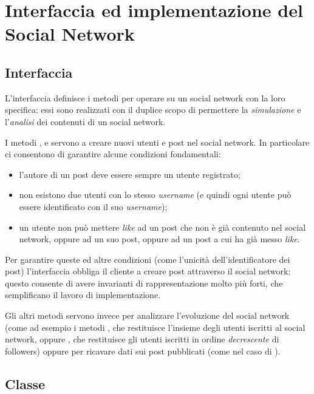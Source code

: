 \section{Interfaccia ed implementazione del Social Network}
\label{sec:sn}

\subsection{Interfaccia }

L'interfaccia  definisce i metodi per operare su un social network con la loro specifica: essi sono realizzati con il duplice scopo di permettere la \emph{simulazione} e l'\emph{analisi} dei contenuti di un social network.

I metodi ,  e  servono a creare nuovi utenti e post nel social network. In particolare ci consentono di garantire alcune condizioni fondamentali:
\begin{itemize}
    \item l'autore di un post deve essere sempre un utente registrato;
    \item non esistono due utenti con lo stesso \emph{username} (e quindi ogni utente può essere identificato con il suo \emph{username});
    \item un utente non può mettere \emph{like} ad un post che non è già contenuto nel social network, oppure ad un suo post, oppure ad un post a cui ha già messo \emph{like}.
\end{itemize}

Per garantire queste ed altre condizioni (come l'unicità dell'identificatore dei post) l'interfaccia  obbliga il cliente a creare post attraverso il social network: questo consente di avere invarianti di rappresentazione molto più forti, che semplificano il lavoro di implementazione.

Gli altri metodi servono invece per analizzare l'evoluzione del social network (come ad esempio i metodi , che restituisce l'insieme degli utenti iscritti al social network, oppure , che restituisce gli utenti iscritti in ordine \emph{decrescente} di followers) oppure per ricavare dati sui post pubblicati (come nel caso di ).

\subsection{Classe }

